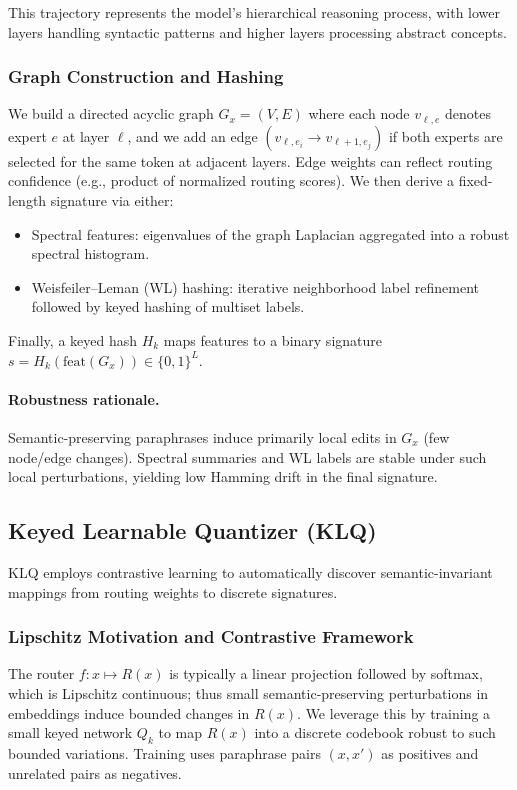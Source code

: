 This trajectory represents the model's hierarchical reasoning process, with lower layers handling syntactic patterns and higher layers processing abstract concepts.

\subsubsection{Graph Construction and Hashing}

We build a directed acyclic graph $G_x=(V,E)$ where each node $v_{\ell,e}$ denotes expert $e$ at layer $\ell$, and we add an edge $(v_{\ell,e_i} \to v_{\ell+1,e_j})$ if both experts are selected for the same token at adjacent layers. Edge weights can reflect routing confidence (e.g., product of normalized routing scores). We then derive a fixed-length signature via either:
\begin{itemize}
\item Spectral features: eigenvalues of the graph Laplacian aggregated into a robust spectral histogram.
\item Weisfeiler--Leman (WL) hashing: iterative neighborhood label refinement followed by keyed hashing of multiset labels.
\end{itemize}
Finally, a keyed hash $H_k$ maps features to a binary signature $s = H_k(\text{feat}(G_x)) \in \{0,1\}^L$.

\paragraph{Robustness rationale.} Semantic-preserving paraphrases induce primarily local edits in $G_x$ (few node/edge changes). Spectral summaries and WL labels are stable under such local perturbations, yielding low Hamming drift in the final signature.

\subsection{Keyed Learnable Quantizer (KLQ)}

KLQ employs contrastive learning to automatically discover semantic-invariant mappings from routing weights to discrete signatures.

\subsubsection{Lipschitz Motivation and Contrastive Framework}

The router $f: x \mapsto R(x)$ is typically a linear projection followed by softmax, which is Lipschitz continuous; thus small semantic-preserving perturbations in embeddings induce bounded changes in $R(x)$. We leverage this by training a small keyed network $Q_k$ to map $R(x)$ into a discrete codebook robust to such bounded variations. Training uses paraphrase pairs $(x,x')$ as positives and unrelated pairs as negatives.

